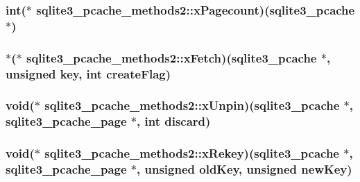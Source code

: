 \hypertarget{structsqlite3__pcache__methods2_5d51aba3927db1da9acf31fbdf7d57b5}{
\subsubsection[xPagecount]{\setlength{\rightskip}{0pt plus 5cm}int($\ast$ {\bf sqlite3\_\-pcache\_\-methods2::xPagecount})({\bf sqlite3\_\-pcache} $\ast$)}}
\label{structsqlite3__pcache__methods2_5d51aba3927db1da9acf31fbdf7d57b5}


\hypertarget{structsqlite3__pcache__methods2_d534a6947b55fd42fde011dab490cd0f}{
\subsubsection[xFetch]{$\ast$($\ast$ {\bf sqlite3\_\-pcache\_\-methods2::xFetch})({\bf sqlite3\_\-pcache} $\ast$, unsigned key, int createFlag)}}
\label{structsqlite3__pcache__methods2_d534a6947b55fd42fde011dab490cd0f}


\hypertarget{structsqlite3__pcache__methods2_c94294551eda282f17b1ed2a110e1850}{
\subsubsection[xUnpin]{\setlength{\rightskip}{0pt plus 5cm}void($\ast$ {\bf sqlite3\_\-pcache\_\-methods2::xUnpin})({\bf sqlite3\_\-pcache} $\ast$, {\bf sqlite3\_\-pcache\_\-page} $\ast$, int discard)}}
\label{structsqlite3__pcache__methods2_c94294551eda282f17b1ed2a110e1850}


\hypertarget{structsqlite3__pcache__methods2_28a22927b108182e22025bbe6ba1f68e}{
\subsubsection[xRekey]{\setlength{\rightskip}{0pt plus 5cm}void($\ast$ {\bf sqlite3\_\-pcache\_\-methods2::xRekey})({\bf sqlite3\_\-pcache} $\ast$, {\bf sqlite3\_\-pcache\_\-page} $\ast$, unsigned oldKey, unsigned newKey)}}
\label{structsqlite3__pcache__methods2_28a22927b108182e22025bbe6ba1f68e}


